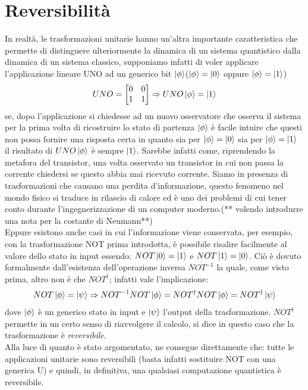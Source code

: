 \documentclass[12pt,a4paper,openright]{report}
\begin{document}
\section{Reversibilità}
In realtà, le trasformazioni unitarie hanno un'altra importante caratteristica che permette di distinguere ulteriormente la dinamica di un sistema quantistico
dalla dinamica di un sistema classico, supponiamo infatti di voler applicare l'applicazione lineare UNO ad un generico bit $\ket{\phi}$($\ket{\phi}=\ket0$ oppure $\ket{\phi}=\ket1$)
\[
UNO=
    \begin{bmatrix}
        0 & 0\\
        1 & 1 
    \end{bmatrix}
    \Rightarrow
    UNO\ket{\phi} = \ket1
\]
se, dopo l'applicazione si chiedesse ad un nuovo osservatore che osserva il sistema per la prima volta di ricostruire lo stato di partenza $\ket{\phi}$
è facile intuire che questi non possa fornire una risposta certa in quanto sia per $\ket{\phi}=\ket0$ sia per $\ket{\phi}=\ket1$ il risultato di $UNO\ket{\phi}$
è sempre $\ket{1}$. Sarebbe infatti come, riprendendo la metafora del transistor, una volta osservato un transistor in cui non passa la
corrente chiedersi se questo abbia mai ricevuto corrente. Siamo in presenza di trasformazioni che causano una perdita d'informazione,
questo fenomeno nel mondo fisico si traduce in rilascio di calore ed è uno dei problemi di cui tener conto durante l'ingegnerizzazione di un
computer moderno.(** volendo introdurre una nota per la costante di Neumann**) \\ 
Eppure esistono anche casi in cui l'informazione viene conservata, per esempio, con la trasformazione NOT prima introdotta, è possibile risalire facilmente al 
valore dello stato in input essendo: $NOT\ket0 = \ket1$ e $NOT\ket1 = \ket0$. Ciò è dovuto formalmente dall'esistenza dell'operazione inversa $NOT^{-1}$ la quale,
come visto prima, altro non è che $NOT^{\dag}$; infatti vale l'implicazione: \[NOT\ket{\phi}=\ket{\psi}\Rightarrow NOT^{-1}NOT\ket{\phi}= NOT^{\dag}NOT\ket{\phi}=NOT^{\dag}\ket{\psi}\] dove 
$\ket{\phi}$ è un generico stato in input e $\ket{\psi}$ l'output della trasformazione. $NOT^{\dag}$ permette in un certo senso di riavvolgere il calcolo, si dice in questo caso che
la trasformazione è \emph{reversibile}.\\
Alla luce di quanto è stato argomentato, ne consegue direttamente che: tutte le applicazioni unitarie sono reversibili (basta infatti sostituire NOT con una generica U) e quindi, in definitiva, 
una qualsiasi computazione quantistica è reversibile. 
\end{document}
